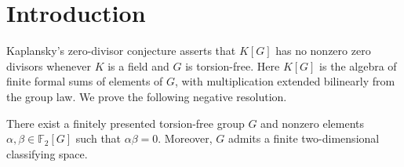 \begin{abstract}
We disprove Kaplansky's zero-divisor conjecture by constructing a finitely presented torsion-free group \(G\) for which \(\mathbb F_2[G]\) has nonzero zero divisors. The group admits a finite two-dimensional classifying space.
\end{abstract}

\section{Introduction}\label{sec:introduction}

Kaplansky's zero-divisor conjecture asserts that \(K[G]\) has no nonzero zero divisors whenever \(K\) is a field and \(G\) is torsion-free. Here \(K[G]\) is the algebra of finite formal sums of elements of \(G\), with multiplication extended bilinearly from the group law. We prove the following negative resolution.

\begin{theorem}\label{thm:main}
There exist a finitely presented torsion-free group \(G\) and nonzero elements
\(\alpha,\beta\in\mathbb F_2[G]\) such that \(\alpha\beta=0\).
Moreover, \(G\) admits a finite two-dimensional classifying space.
\end{theorem}

